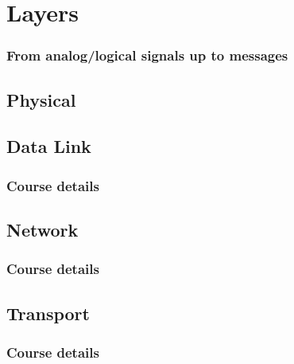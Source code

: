 \section{Layers}
  \begin{frame}
    \frametitle{From analog/logical signals up to messages}
  \end{frame}
\subsection{Physical}
  \begin{frame}
    \frametitle{}
  \end{frame}
\subsection{Data Link}
  \begin{frame}
    \frametitle{Course details}
  \end{frame}
\subsection{Network}
  \begin{frame}
    \frametitle{Course details}
  \end{frame}
\subsection{Transport}
  \begin{frame}
    \frametitle{Course details}
  \end{frame}
